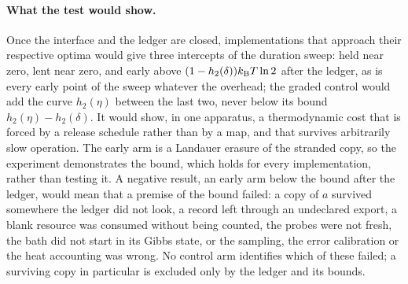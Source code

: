 \paragraph{What the test would show.} Once the interface and the ledger are closed, implementations that approach their respective optima would give three intercepts of the duration sweep: held near zero, lent near zero, and early above $(1-h_2(\delta))k_{\mathrm B} T\ln2$ after the ledger, as is every early point of the sweep whatever the overhead; the graded control would add the curve $h_2(\eta)$ between the last two, never below its bound $h_2(\eta)-h_2(\delta)$. It would show, in one apparatus, a thermodynamic cost that is forced by a release schedule rather than by a map, and that survives arbitrarily slow operation. The early arm is a Landauer erasure of the stranded copy, so the experiment demonstrates the bound, which holds for every implementation, rather than testing it. A negative result, an early arm below the bound after the ledger, would mean that a premise of the bound failed: a copy of $a$ survived somewhere the ledger did not look, a record left through an undeclared export, a blank resource was consumed without being counted, the probes were not fresh, the bath did not start in its Gibbs state, or the sampling, the error calibration or the heat accounting was wrong. No control arm identifies which of these failed; a surviving copy in particular is excluded only by the ledger and its bounds.
